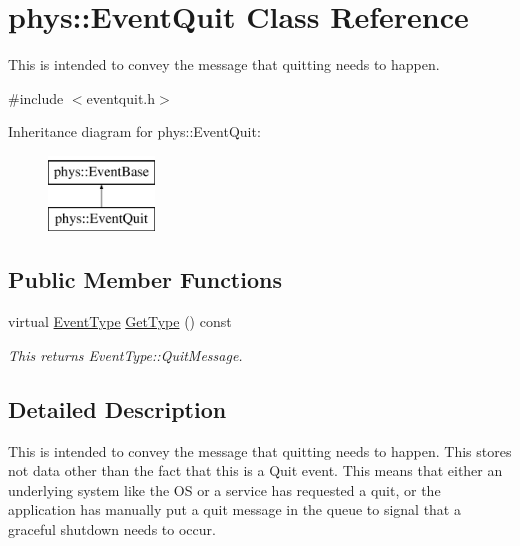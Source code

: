 \hypertarget{classphys_1_1EventQuit}{
\section{phys::EventQuit Class Reference}
\label{dd/dea/classphys_1_1EventQuit}
}


This is intended to convey the message that quitting needs to happen.  




{\ttfamily \#include $<$eventquit.h$>$}

Inheritance diagram for phys::EventQuit:\begin{figure}[H]
\begin{center}
\leavevmode
\includegraphics[height=2cm]{dd/dea/classphys_1_1EventQuit}
\end{center}
\end{figure}
\subsection*{Public Member Functions}
\begin{DoxyCompactItemize}
\item 
virtual \hyperlink{classphys_1_1EventBase_a5e6a8564e127f654123f0bf6a2751923}{EventType} \hyperlink{classphys_1_1EventQuit_a3bfca875349e73dbda47c3c62a253e3b}{GetType} () const 
\begin{DoxyCompactList}\small\item\em This returns EventType::QuitMessage. \item\end{DoxyCompactList}\end{DoxyCompactItemize}


\subsection{Detailed Description}
This is intended to convey the message that quitting needs to happen. This stores not data other than the fact that this is a Quit event. This means that either an underlying system like the OS or a service has requested a quit, or the application has manually put a quit message in the queue to signal that a graceful shutdown needs to occur. 

